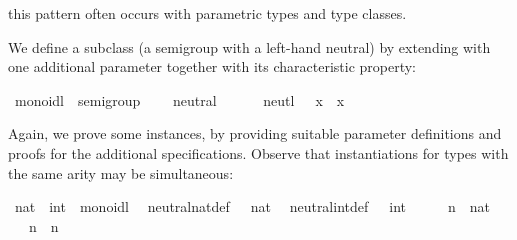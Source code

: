 \begin{isabellebody}
\begin{isamarkuptext}
  this pattern often occurs with parametric types and type classes.%
\end{isamarkuptext}%
\isamarkuptrue%
%
\isamarkuptrue%
%
\begin{isamarkuptext}%
We define a subclass  (a semigroup with a left-hand
  neutral) by extending  with one additional
  parameter  together with its characteristic property:%
\end{isamarkuptext}%
\isamarkuptrue%
%
\isadelimquote
%
\endisadelimquote
%
\isatagquote
{}\isamarkupfalse%
\ monoidl\ {\isacharequal}\ semigroup\ {\isacharplus}\isanewline
\ \ \ neutral\ {\isacharcolon}{\isacharcolon}\ {\isachardoublequoteopen}{\isasymalpha}{\isachardoublequoteclose}\ {\isacharparenleft}{\isachardoublequoteopen}{\isasymone}{\isachardoublequoteclose}{\isacharparenright}\isanewline
\ \ \ neutl{\isacharcolon}\ {\isachardoublequoteopen}{\isasymone}\ {\isasymotimes}\ x\ {\isacharequal}\ x{\isachardoublequoteclose}%
\endisatagquote
{\isafoldquote}%
%
\isadelimquote
%
\endisadelimquote
%
\begin{isamarkuptext}%
\noindent Again, we prove some instances, by providing suitable
  parameter definitions and proofs for the additional specifications.
  Observe that instantiations for types with the same arity may be
  simultaneous:%
\end{isamarkuptext}%
\isamarkuptrue%
%
\isadelimquote
%
\endisadelimquote
%
\isatagquote
{}\isamarkupfalse%
\ nat\ \ int\ {\isacharcolon}{\isacharcolon}\ monoidl\isanewline
{}\isanewline
\isanewline
{}\isamarkupfalse%
\isanewline
\ \ neutral{\isacharunderscore}nat{\isacharunderscore}def{\isacharcolon}\ {\isachardoublequoteopen}{\isasymone}\ {\isacharequal}\ {\isacharparenleft}{}{\isasymColon}nat{\isacharparenright}{\isachardoublequoteclose}\isanewline
\isanewline
{}\isamarkupfalse%
\isanewline
\ \ neutral{\isacharunderscore}int{\isacharunderscore}def{\isacharcolon}\ {\isachardoublequoteopen}{\isasymone}\ {\isacharequal}\ {\isacharparenleft}{}{\isasymColon}int{\isacharparenright}{\isachardoublequoteclose}\isanewline
\isanewline
{}\isamarkupfalse%
\ \isamarkupfalse%
\isanewline
\ \ \isamarkupfalse%
\ n\ {\isacharcolon}{\isacharcolon}\ nat\isanewline
\ \ \isamarkupfalse%
\ {\isachardoublequoteopen}{\isasymone}\ {\isasymotimes}\ n\ {\isacharequal}\ n{\isachardoublequoteclose}\isanewline

\end{isabellebody}
